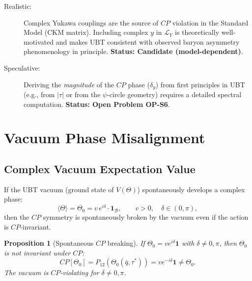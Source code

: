 \documentclass[12pt,a4paper]{article}
\newtheorem{proposition}[theorem]{Proposition}
\theoremstyle{definition}
\theoremstyle{remark}
\begin{document}
\begin{description}
  \item[Realistic:]
    Complex Yukawa couplings are the source of $CP$ violation in the
    Standard Model (CKM matrix).  Including complex $y$ in $\mathcal{L}_Y$
    is theoretically well-motivated and makes UBT consistent with observed
    baryon asymmetry phenomenology in principle.
    \textbf{Status: Candidate (model-dependent)}.

  \item[Speculative:]
    Deriving the \emph{magnitude} of the $CP$ phase ($\delta_y$) from
    first principles in UBT (e.g., from $|\tau|$ or from the $\psi$-circle
    geometry) requires a detailed spectral computation.
    \textbf{Status: Open Problem OP-S6}.
\end{description}

\section{Vacuum Phase Misalignment}
\label{sec:cp:vacuum}

\subsection{Complex Vacuum Expectation Value}

If the UBT vacuum (ground state of $V(\Theta)$) spontaneously develops a
complex phase:
\begin{equation}
  \langle\Theta\rangle = \Theta_0 = v\, e^{i\delta}\cdot\mathbf{1}_{\mathcal{B}},
  \qquad v > 0,\quad \delta \in (0,\pi),
  \label{eq:cp:vev}
\end{equation}
then the $CP$ symmetry is spontaneously broken by the vacuum even if the action
is $CP$-invariant.

\begin{proposition}[Spontaneous $CP$ breaking]
\label{prop:cp:spont_CP}
If $\Theta_0 = ve^{i\delta}\mathbf{1}$ with $\delta\neq 0,\pi$,
then $\Theta_0$ is not invariant under $CP$:
\begin{equation}
  CP[\Theta_0] = P_{12}(\Theta_0(\bar q, \tau^*))
  = ve^{-i\delta}\mathbf{1} \neq \Theta_0.
\end{equation}
The vacuum is $CP$-violating for $\delta\neq0,\pi$.
\end{proposition}
\end{document}
